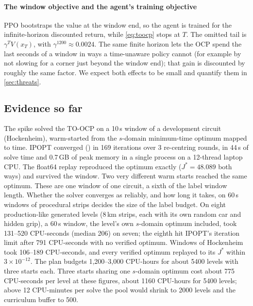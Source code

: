 \paragraph{The window objective and the agent's training objective} PPO bootstraps the
value at the window end, so the agent is trained for the infinite-horizon discounted
return, while \cref{eq:toocp} stops at $T$. The omitted tail is $\gamma^{T}V(x_T)$, with
$\gamma^{1200} \approx 0.0024$. The same finite horizon lets the OCP spend the last
seconds of a window in ways a time-unaware policy cannot (for example by not slowing for a
corner just beyond the window end); that gain is discounted by roughly the same factor.
We expect both effects to be small and quantify them in \cref{sec:threats}.

\subsection{Evidence so far}
\label{sec:answer-evidence}

The spike solved the TO-OCP on a 10\,s window of a development circuit (Hockenheim),
warm-started from the $s$-domain minimum-time optimum mapped to time. IPOPT converged
() in 169 iterations over 3 re-centring rounds, in 44\,s of solve
time and 0.7\,GB of peak memory in a single process on a 12-thread laptop CPU. The
float64 replay reproduced the
optimum exactly ($J^* = 48.089$ both ways) and survived the window.
Two very different warm starts reached the same optimum.
These are one window of one circuit, a sixth of the label window length. Whether the
solver converges as reliably, and how long it takes, on 60\,s windows of procedural
strips decides the size of the label budget.
On eight production-like generated levels (8\,km strips, each with its own random car and
hidden grip), a 60\,s window, the level's own $s$-domain optimum included, took 131--520
CPU-seconds (median 206) on seven; the eighth hit IPOPT's iteration limit after 791
CPU-seconds with no verified optimum. Windows of Hockenheim took 106--189 CPU-seconds, and
every verified optimum replayed to its $J^*$ within $3\times10^{-12}$.
The plan budgets 1,200--3,000 CPU-hours for about \num{5400} levels with three starts
each. Three starts sharing one $s$-domain optimum cost about 775 CPU-seconds per level at
these figures, about \num{1160} CPU-hours for \num{5400} levels; above 12 CPU-minutes per
solve the pool would shrink to \num{2000} levels and the curriculum buffer to 500.

